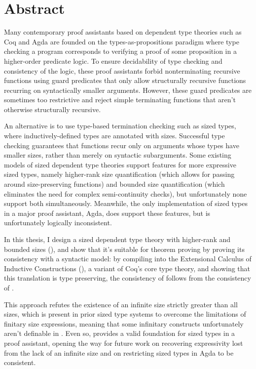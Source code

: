 \chapter{Abstract}

Many contemporary proof assistants based on dependent type theories such as Coq and Agda
are founded on the types-as-propositions paradigm where type checking a program
corresponds to verifying a proof of some proposition in a higher-order predicate logic.
To ensure decidability of type checking and consistency of the logic,
these proof assistants forbid nonterminating recursive functions
using guard predicates that only allow structurally recursive functions
recurring on syntactically smaller arguments.
However, these guard predicates are sometimes too restrictive
and reject simple terminating functions that aren't otherwise structurally recursive.

An alternative is to use type-based termination checking such as sized types,
where inductively-defined types are annotated with sizes.
Successful type checking guarantees that functions recur only on arguments whose types have smaller sizes,
rather than merely on syntactic subarguments.
Some existing models of sized dependent type theories
support features for more expressive sized types,
namely higher-rank size quantification
(which allows for passing around size-preserving functions)
and bounded size quantification
(which eliminates the need for complex semi-continuity checks),
but unfortunately none support both simultaneously.
Meanwhile, the only implementation of sized types in a major proof assistant, Agda,
does support these features, but is unfortunately logically inconsistent.

In this thesis, I design a sized dependent type theory with higher-rank and bounded sizes (\lang),
and show that it's suitable for theorem proving by proving its consistency with a syntactic model:
by compiling \lang into the Extensional Calculus of Inductive Constructions (\CICE),
a variant of Coq's core type theory,
and showing that this translation is type preserving,
the consistency of \lang follows from the consistency of \CICE.

This approach refutes the existence of an infinite size strictly greater than all sizes,
which is present in prior sized type systems to overcome the limitations of finitary size expressions,
meaning that some infinitary constructs unfortunately aren't definable in \lang.
Even so, \lang provides a valid foundation for sized types in a proof assistant,
opening the way for future work on recovering expressivity lost from the lack of an infinite size
and on restricting sized types in Agda to be consistent.